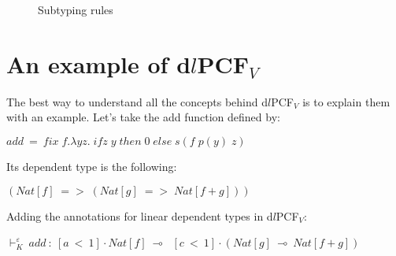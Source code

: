 \documentclass[a4paper,12pt]{article}
\begin{document}
\begin{figure}[ht]
  \begin{center}
    \end{center}
  \caption{Subtyping rules}
  \label{subtyping}
\end{figure}


\section{An example of d$l$PCF$_{V}$}

The best way to understand all the concepts behind d$l$PCF$_{V}$ is to
explain them with an example. Let's take the add function defined by:

\begin{center}
$add~=~fix\;f.\lambda yz.\;ifz\;y\;then\;0\;else\;s(f\;p(y)\;z)$
\end{center}

Its dependent type is the following:

\begin{center}
$(Nat[f]\; =>\;(Nat[g]\; =>\;Nat[f + g]))$
\end{center}

Adding the annotations for linear dependent types in d$l$PCF$_{V}$:

\begin{center}
$\vdash^{\varepsilon}_{K}~add~:~[a~<~1] \cdot Nat[f]~\multimap~$
  $[c~<~1] \cdot (Nat[g]~\multimap~Nat[f + g])$
\end{center}
\end{document}
